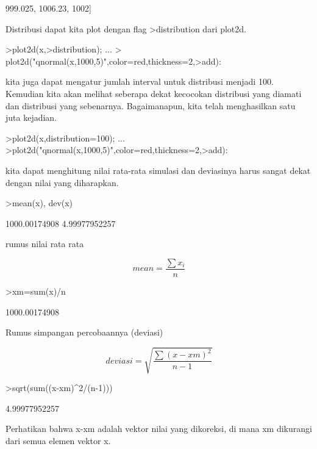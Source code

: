 \documentclass[a4paper,10pt]{article}
\begin{document}
\begin{eulernotebook}
\begin{eulercomment}
\begin{eulercomment}
\begin{euleroutput}
  999.025,  1006.23,  1002]
\end{euleroutput}
\begin{eulercomment}
Distribusi dapat kita plot dengan flag \textgreater{}distribution dari plot2d.
\end{eulercomment}
\begin{eulerprompt}
>plot2d(x,>distribution);  ...
> plot2d("qnormal(x,1000,5)",color=red,thickness=2,>add):
\end{eulerprompt}
\begin{eulercomment}
kita juga dapat mengatur jumlah interval untuk distribusi menjadi 100.
Kemudian kita akan melihat seberapa dekat kecocokan distribusi yang
diamati dan distribusi yang sebenarnya. Bagaimanapun, kita telah
menghasilkan satu juta kejadian.
\end{eulercomment}
\begin{eulerprompt}
>plot2d(x,distribution=100); ...
>plot2d("qnormal(x,1000,5)",color=red,thickness=2,>add):
\end{eulerprompt}
\begin{eulercomment}
kita dapat menghitung nilai rata-rata simulasi dan deviasinya harus
sangat dekat dengan nilai yang diharapkan.
\end{eulercomment}
\begin{eulerprompt}
>mean(x), dev(x)
\end{eulerprompt}
\begin{euleroutput}
  1000.00174908
  4.99977952257
\end{euleroutput}
\begin{eulercomment}
rumus nilai rata rata

\end{eulercomment}
\begin{eulerformula}
\[
mean = \frac{\sum x_i}{n}
\]
\end{eulerformula}
\begin{eulerprompt}
>xm=sum(x)/n
\end{eulerprompt}
\begin{euleroutput}
  1000.00174908
\end{euleroutput}
\begin{eulercomment}
Rumus simpangan percobaannya (deviasi)\\
\end{eulercomment}
\begin{eulerformula}
\[
deviasi= \sqrt{\frac{\sum (x - xm)^2}{n-1}}
\]
\end{eulerformula}
\begin{eulerprompt}
>sqrt(sum((x-xm)^2/(n-1)))
\end{eulerprompt}
\begin{euleroutput}
  4.99977952257
\end{euleroutput}
\begin{eulercomment}
Perhatikan bahwa x-xm adalah vektor nilai yang dikoreksi, di mana xm
dikurangi dari semua elemen vektor x.


\end{eulercomment}
\end{eulercomment}
\end{eulercomment}
\end{eulernotebook}
\end{document}
